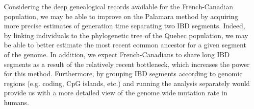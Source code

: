 \documentclass[
11pt, %
oneside, %
english, %
doublespacing, %
headsepline, %
chapterinoneline, %
]{MastersDoctoralThesis} %
\begin{document}
Considering the deep genealogical records available for the French-Canadian population, we may be able to improve on the Palamara method by acquiring more precise estimates of generation time separating two IBD segments.
Indeed, by linking individuals to the phylogenetic tree of the Quebec population, we may be able to better estimate the most recent common ancestor for a given segment of the genome.
In addition, we expect French-Canadians to share long IBD segments as a result of the relatively recent bottleneck, which increases the power for this method.
Furthermore, by grouping IBD segments according to genomic regions (e.g. coding, CpG islands, etc.) and running the analysis separately would provide us with a more detailed view of the genome wide mutation rate in humans.


\clearpage
\appendix %
\end{document}
